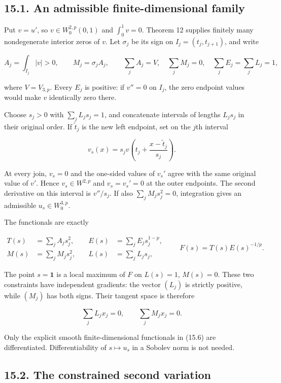 \documentclass[11pt]{article}
\begin{document}
\subsection{15.1. An admissible finite-dimensional
family}\label{an-admissible-finite-dimensional-family}

Put \(v=u'\), so \(v\in W_0^{2,p}(0,1)\) and \(\int_0^1v=0\). Theorem 12
supplies finitely many nondegenerate interior zeros of \(v\). Let
\(\sigma_j\) be its sign on \(I_j=(t_j,t_{j+1})\), and write

\[
A_j=\int_{I_j}|v|>0,\qquad M_j=\sigma_jA_j,
\qquad \sum_jA_j=V,\quad \sum_jM_j=0,
\quad \sum_jE_j=\sum_jL_j=1,
\tag{15.4}
\]

where \(V=V_{3,p}\). Every \(E_j\) is positive: if \(v''=0\) on \(I_j\),
the zero endpoint values would make \(v\) identically zero there.

Choose \(s_j>0\) with \(\sum_jL_js_j=1\), and concatenate intervals of
lengths \(L_js_j\) in their original order. If \(\widetilde t_j\) is the
new left endpoint, set on the \(j\)th interval

\[
v_s(x)=s_jv\left(t_j+\frac{x-\widetilde t_j}{s_j}\right).
\tag{15.5}
\]

At every join, \(v_s=0\) and the one-sided values of \(v_s'\) agree with
the same original value of \(v'\). Hence \(v_s\in W^{2,p}\) and
\(v_s=v_s'=0\) at the outer endpoints. The second derivative on this
interval is \(v''/s_j\). If also \(\sum_jM_js_j^2=0\), integration gives
an admissible \(u_s\in W_0^{3,p}\).

The functionals are exactly

\[
\begin{aligned}
T(s)&=\sum_jA_js_j^2,&\quad E(s)&=\sum_jE_js_j^{1-p},\\
M(s)&=\sum_jM_js_j^2,&\quad L(s)&=\sum_jL_js_j,
\end{aligned}
\qquad F(s)=T(s)E(s)^{-1/p}.
\tag{15.6}
\]

The point \(s=\mathbf1\) is a local maximum of \(F\) on \(L(s)=1\),
\(M(s)=0\). These two constraints have independent gradients: the vector
\((L_j)\) is strictly positive, while \((M_j)\) has both signs. Their
tangent space is therefore

\[
\sum_jL_jx_j=0,\qquad \sum_jM_jx_j=0.
\tag{15.7}
\]

Only the explicit smooth finite-dimensional functionals in (15.6) are
differentiated. Differentiability of \(s\mapsto u_s\) in a Sobolev norm
is not needed.

\subsection{15.2. The constrained second
variation}\label{the-constrained-second-variation}
\end{document}
